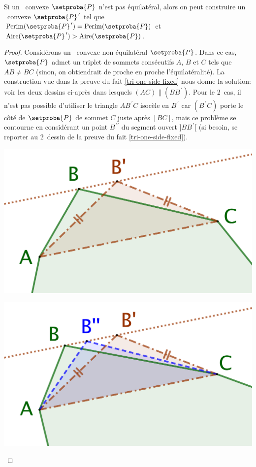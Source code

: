 

\begin{fact} \label{must-be-equi}
	Si un \ngone\ convexe $\setproba{P}$ n'est pas équilatéral, alors on peut construire un \ngone\ convexe $\primeit{\setproba{P}}$ tel que
	$\perim{\primeit{\setproba{P}}} = \perim{\setproba{P}}$
	et
	$\area{\primeit{\setproba{P}}} > \area{\setproba{P}}$.
\end{fact}


\begin{proof}
	Considérons un \ngone\ convexe non équilatéral $\setproba{P}$.
	Dans ce cas, $\setproba{P}$ admet un triplet de sommets consécutifs $A$, $B$ et $C$ tels que $AB \neq BC$
	(sinon, on obtiendrait de proche en proche l'équilatéralité).
	La construction vue dans la preuve du fait \ref{tri-one-side-fixed} nous donne la solution: voir les deux dessins ci-après dans lesquels $(AC) \parallel (BB^{\,\prime})$.
	Pour le 2\ieme\ cas, il n'est pas possible d'utiliser le triangle $AB^{\,\prime}C$ isocèle en $B^{\,\prime}$ car $(B^{\,\prime}C)$ porte le côté de $\setproba{P}$ de sommet $C$ juste après $[BC]$, mais ce problème se contourne en considérant un point $B^{\,\prime\prime}$ du segment ouvert $]BB^{\,\prime}[$ (si besoin, se reporter au 2\ieme\ dessin de la preuve du fait \ref{tri-one-side-fixed}).
	\begin{multicols}{2}
		\centering

		\includegraphics[scale=.4]{content/polygon/sol-must-be/not-iso-OK.png}

		\includegraphics[scale=.4]{content/polygon/sol-must-be/not-iso-KO.png}
	\end{multicols}


\end{proof}
